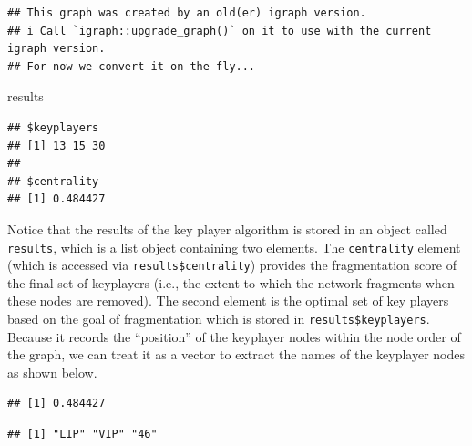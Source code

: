 \documentclass[
]{book}
\newenvironment{Shaded}{\begin{snugshade}}{\end{snugshade}}
\newcommand{\CommentTok}[1]{\textcolor[rgb]{0.56,0.35,0.01}{\textit{#1}}}
\newcommand{\FunctionTok}[1]{\textcolor[rgb]{0.13,0.29,0.53}{\textbf{#1}}}
\newcommand{\NormalTok}[1]{#1}
\newcommand{\SpecialCharTok}[1]{\textcolor[rgb]{0.81,0.36,0.00}{\textbf{#1}}}
\begin{document}
\begin{verbatim}
## This graph was created by an old(er) igraph version.
## i Call `igraph::upgrade_graph()` on it to use with the current igraph version.
## For now we convert it on the fly...
\end{verbatim}

\begin{Shaded}
\begin{Highlighting}[]
\NormalTok{results}
\end{Highlighting}
\end{Shaded}

\begin{verbatim}
## $keyplayers
## [1] 13 15 30
## 
## $centrality
## [1] 0.484427
\end{verbatim}

Notice that the results of the key player algorithm is stored in an object called \texttt{results}, which is a list object containing two elements. The \texttt{centrality} element (which is accessed via \texttt{results\$centrality}) provides the fragmentation score of the final set of keyplayers (i.e., the extent to which the network fragments when these nodes are removed). The second element is the optimal set of key players based on the goal of fragmentation which is stored in \texttt{results\$keyplayers}. Because it records the ``position'' of the keyplayer nodes within the node order of the graph, we can treat it as a vector to extract the names of the keyplayer nodes as shown below.

\begin{Shaded}
\end{Shaded}

\begin{verbatim}
## [1] 0.484427
\end{verbatim}

\begin{Shaded}
\end{Shaded}

\begin{verbatim}
## [1] "LIP" "VIP" "46"
\end{verbatim}
\end{document}
